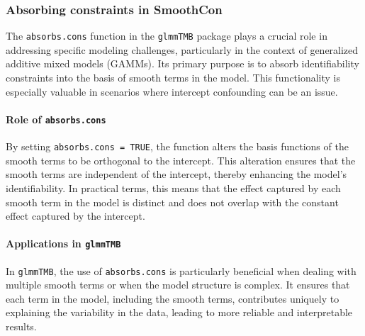 \subsubsection{Absorbing constraints in SmoothCon}

The \texttt{absorbs.cons} function in the \texttt{glmmTMB} package plays a crucial role in addressing specific modeling challenges, particularly in the context of generalized additive mixed models (GAMMs). Its primary purpose is to absorb identifiability constraints into the basis of smooth terms in the model. This functionality is especially valuable in scenarios where intercept confounding can be an issue.


\paragraph{Role of \texttt{absorbs.cons}}
By setting \texttt{absorbs.cons = TRUE}, the function alters the basis functions of the smooth terms to be orthogonal to the intercept. This alteration ensures that the smooth terms are independent of the intercept, thereby enhancing the model's identifiability. In practical terms, this means that the effect captured by each smooth term in the model is distinct and does not overlap with the constant effect captured by the intercept.

\paragraph{Applications in \texttt{glmmTMB}}
In \texttt{glmmTMB}, the use of \texttt{absorbs.cons} is particularly beneficial when dealing with multiple smooth terms or when the model structure is complex. It ensures that each term in the model, including the smooth terms, contributes uniquely to explaining the variability in the data, leading to more reliable and interpretable results.
